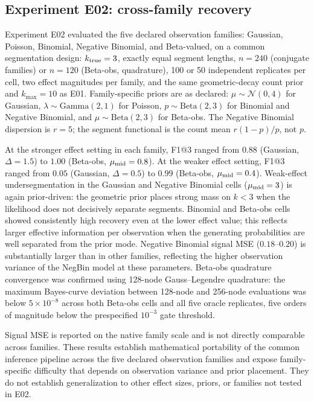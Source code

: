 

\FloatBarrier
\subsection{Experiment E02: cross-family recovery}
Experiment E02 evaluated the five declared observation families: Gaussian, Poisson, Binomial, Negative Binomial, and Beta-valued, on a common segmentation design: $k_{\rm true}=3$, exactly equal segment lengths, $n=240$ (conjugate families) or $n=120$ (Beta-obs, quadrature), 100 or 50 independent replicates per cell, two effect magnitudes per family, and the same geometric-decay count prior and $k_{\max}=10$ as E01. Family-specific priors are as declared: $\mu\sim\mathcal{N}(0,4)$ for Gaussian, $\lambda\sim\mathrm{Gamma}(2,1)$ for Poisson, $p\sim\mathrm{Beta}(2,3)$ for Binomial and Negative Binomial, and $\mu\sim\mathrm{Beta}(2,3)$ for Beta-obs. The Negative Binomial dispersion is $r=5$; the segment functional is the count mean $r(1-p)/p$, not $p$.

At the stronger effect setting in each family, F1@3 ranged from $0.88$ (Gaussian, $\Delta=1.5$) to $1.00$ (Beta-obs, $\mu_{\rm mid}=0.8$). At the weaker effect setting, F1@3 ranged from $0.05$ (Gaussian, $\Delta=0.5$) to $0.99$ (Beta-obs, $\mu_{\rm mid}=0.4$). Weak-effect undersegmentation in the Gaussian and Negative Binomial cells ($\mu_{\rm mid}=3$) is again prior-driven: the geometric prior places strong mass on $k<3$ when the likelihood does not decisively separate segments. Binomial and Beta-obs cells showed consistently high recovery even at the lower effect value; this reflects larger effective information per observation when the generating probabilities are well separated from the prior mode. Negative Binomial signal MSE ($0.18$--$0.20$) is substantially larger than in other families, reflecting the higher observation variance of the NegBin model at these parameters. Beta-obs quadrature convergence was confirmed using 128-node Gauss--Legendre quadrature: the maximum Bayes-curve deviation between 128-node and 256-node evaluations was below $5\times10^{-8}$ across both Beta-obs cells and all five oracle replicates, five orders of magnitude below the prespecified $10^{-3}$ gate threshold.





Signal MSE is reported on the native family scale and is not directly comparable across families. These results establish mathematical portability of the common inference pipeline across the five declared observation families and expose family-specific difficulty that depends on observation variance and prior placement. They do not establish generalization to other effect sizes, priors, or families not tested in E02.

